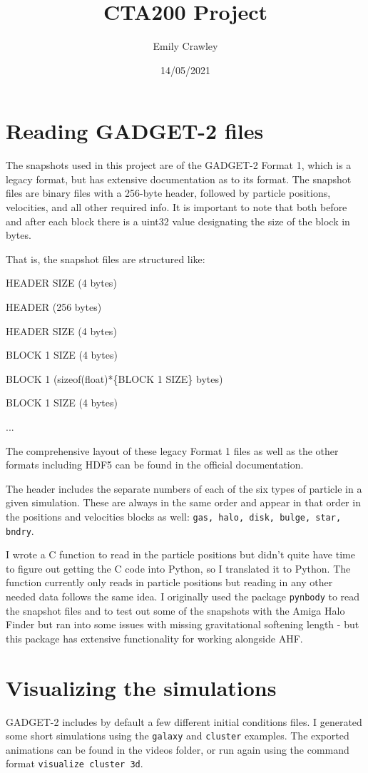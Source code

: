 \documentclass{article}
\title{CTA200 Project}
\author{Emily Crawley}
\date{14/05/2021}
\begin{document}
\maketitle

\section*{Reading GADGET-2 files}
The snapshots used in this project are of the GADGET-2 Format 1, which is a legacy format, but has extensive documentation as to its format. The snapshot files are binary files with a 256-byte header, followed by particle positions, velocities, and all other required info. It is important to note that both before and after each block there is a uint32 value designating the size of the block in bytes.

That is, the snapshot files are structured like:


HEADER SIZE (4 bytes)

HEADER (256 bytes)

HEADER SIZE (4 bytes)

BLOCK 1 SIZE (4 bytes)

BLOCK 1 (sizeof(float)*\{BLOCK 1 SIZE\} bytes)

BLOCK 1 SIZE (4 bytes)

...

The comprehensive layout of these legacy Format 1 files as well as the other formats including HDF5 can be found in the official documentation.

The header includes the separate numbers of each of the six types of particle in a given simulation. These are always in the same order and appear in that order in the positions and velocities blocks as well: \texttt{gas, halo, disk, bulge, star, bndry}.

I wrote a C function to read in the particle positions but didn't quite have time to figure out getting the C code into Python, so I translated it to Python. The function currently only reads in particle positions but reading in any other needed data follows the same idea. I originally used the package \texttt{pynbody} to read the snapshot files and to test out some of the snapshots with the Amiga Halo Finder but ran into some issues with missing gravitational softening length - but this package has extensive functionality for working alongside AHF.

\section*{Visualizing the simulations}
GADGET-2 includes by default a few different initial conditions files. I generated some short simulations using the \texttt{galaxy} and \texttt{cluster} examples. The exported animations can be found in the videos folder, or run again using the command format \texttt{visualize cluster 3d}.
\end{document}

